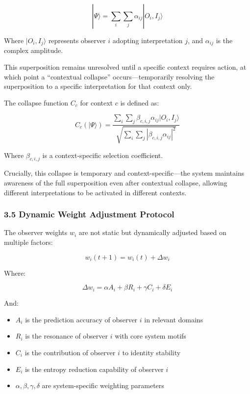 \documentclass[12pt]{article}
\providecommand{\tightlist}{%
  \setlength{\itemsep}{0pt}\setlength{\parskip}{0pt}}
\begin{document}
\[|\Psi\rangle = \sum_i \sum_j \alpha_{ij} |O_i, I_j\rangle\]

Where \(|O_i, I_j\rangle\) represents observer \(i\) adopting
interpretation \(j\), and \(\alpha_{ij}\) is the complex amplitude.

This superposition remains unresolved until a specific context requires
action, at which point a ``contextual collapse'' occurs---temporarily
resolving the superposition to a specific interpretation for that
context only.

The collapse function \(C_c\) for context \(c\) is defined as:

\[C_c(|\Psi\rangle) = \frac{\sum_i \sum_j \beta_{c,i,j} \alpha_{ij} |O_i, I_j\rangle}{\sqrt{\sum_i \sum_j |\beta_{c,i,j} \alpha_{ij}|^2}}\]

Where \(\beta_{c,i,j}\) is a context-specific selection coefficient.

Crucially, this collapse is temporary and context-specific---the system
maintains awareness of the full superposition even after contextual
collapse, allowing different interpretations to be activated in
different contexts.

\subsubsection{3.5 Dynamic Weight Adjustment
Protocol}\label{dynamic-weight-adjustment-protocol}

The observer weights \(w_i\) are not static but dynamically adjusted
based on multiple factors:

\[w_i(t+1) = w_i(t) + \Delta w_i\]

Where:

\[\Delta w_i = \alpha A_i + \beta R_i + \gamma C_i + \delta E_i\]

And:

\begin{itemize}
\tightlist
\item
  \(A_i\) is the prediction accuracy of observer \(i\) in relevant
  domains
\item
  \(R_i\) is the resonance of observer \(i\) with core system motifs
\item
  \(C_i\) is the contribution of observer \(i\) to identity stability
\item
  \(E_i\) is the entropy reduction capability of observer \(i\)
\item
  \(\alpha, \beta, \gamma, \delta\) are system-specific weighting
  parameters
\end{itemize}
\end{document}
